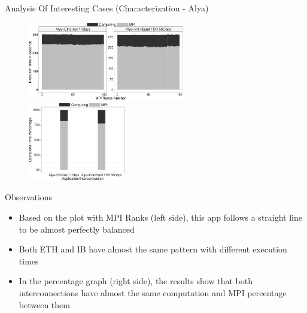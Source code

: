 \documentclass{beamer}
\begin{document}
\begin{frame}{Analysis Of Interesting Cases (Characterization - Alya)}
\begin{figure}
   \includegraphics[width=0.61\textwidth]{SLIDES/img/Alya.charac.pdf}
   \includegraphics[width=0.38\textwidth]{SLIDES/img/Alya.percentage.pdf}
\end{figure}
\pause Observations
\begin{itemize}
    \item Based on the plot with MPI Ranks (left side), this app follows a straight line to be \alert{almost perfectly balanced}
    \pause\item Both ETH and IB have almost the \alert{same pattern} with \alert{different execution times}
    \pause\item In the percentage graph (right side), the results show that both interconnections have almost the \alert{same computation and MPI percentage between them}
\end{itemize}
\end{frame}
\end{document}
